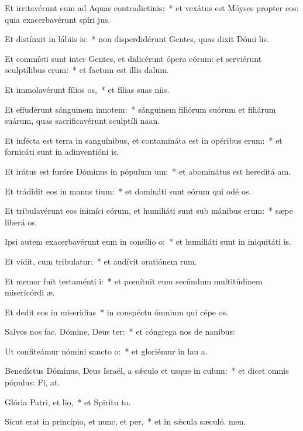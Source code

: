 \item Et irritavérunt eum ad Aquas contradictinis:~* et vexátus est Móyses propter eos: quia exacerbavérunt spíri jus.
\item Et distínxit in lábiis is:~* non disperdidérunt Gentes, quas dixit Dómi lis.
\item Et commísti sunt inter Gentes, et didicérunt ópera eórum: et serviérunt sculptílibus erum:~* et factum est illis  dalum.
\item Et immolavérunt fílios os,~* et fílias suas niis.
\item Et effudérunt sánguinem innotem:~* sánguinem filiórum suórum et filiárum suárum, quas sacrificavérunt sculptíli naan.
\item Et infécta est terra in sanguínibus, et contamináta est in opéribus erum:~* et fornicáti sunt in adinventióni is.
\item Et irátus est furóre Dóminus in pópulum um:~* et abominátus est hereditá am.
\item Et trádidit eos in manus tium:~* et domináti sunt eórum qui odé os.
\item Et tribulavérunt eos inimíci eórum, et humiliáti sunt sub mánibus erum:~* sæpe liberá os.
\item Ipsi autem exacerbavérunt eum in consílio o:~* et humiliáti sunt in iniquitáti is.
\item Et vidit, cum tribulatur:~* et audívit oratiónem rum.
\item Et memor fuit testaménti i:~* et pœnítuit eum secúndum multitúdinem misericórdi æ.
\item Et dedit eos in miseridias~* in conspéctu ómnium qui cépe os.
\item Salvos nos fac, Dómine, Deus ter:~* et cóngrega nos de nanibus:
\item Ut confiteámur nómini sancto o:~* et gloriémur in lau a.
\item Benedíctus Dóminus, Deus Israël, a sǽculo et usque in culum:~* et dicet omnis pópulus: Fi, at.
\item Glória Patri, et lio,~* et Spirítu to.
\item Sicut erat in princípio, et nunc, et per,~* et in sǽcula sæculó. men.
